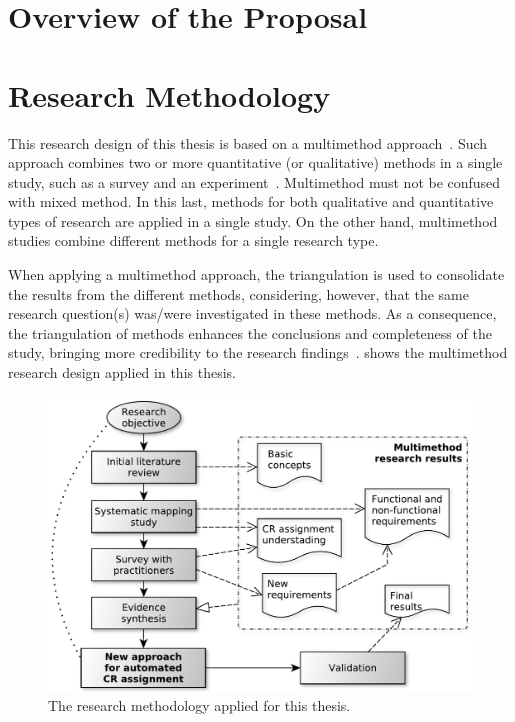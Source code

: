 \section{Overview of the Proposal}
\lipsum[1-5]

\section{Research Methodology}

This research design of this thesis is based on a multimethod
approach~\citep{Hesse-Biber2010}. Such approach combines two or more
quantitative (or qualitative) methods in a single study, such as a survey and an
experiment~\citep{Hesse-Biber2010}. Multimethod must not be confused with mixed
method. In this last, methods for both qualitative and quantitative types of
research are applied in a single study. On the other hand, multimethod studies
combine different methods for a single research type.

When applying a multimethod approach, the triangulation is used to consolidate
the results from the different methods, considering, however, that the same
research question(s) was/were investigated in these methods. As a consequence,
the triangulation of methods enhances the conclusions and completeness of the
study, bringing more credibility to the research
findings~\citep{Hesse-Biber2010}.  shows
the multimethod research design applied in this thesis.

\begin{figure}[h]
\centering
  \includegraphics[width=\columnwidth]{images/research-methodology-thesis.pdf}
  \caption[Research methodology.]{The research methodology applied for this
  thesis.}
  \label{fig:research-methodology-thesis}
\end{figure}

